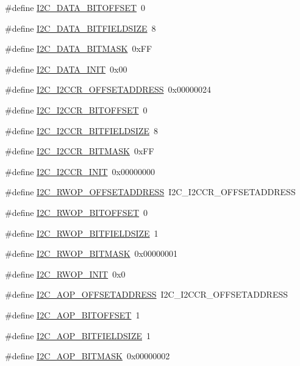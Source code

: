 \begin{DoxyCompactItemize}
\item 
\#define \hyperlink{a00558_ae541003460940c1afc89be6675f78185}{I2C\_\-DATA\_\-BITOFFSET}~0
\item 
\#define \hyperlink{a00558_ac2d18646ada8e52aa14a7a637e2a5b0a}{I2C\_\-DATA\_\-BITFIELDSIZE}~8
\item 
\#define \hyperlink{a00558_af2b064c86fc0a754a497a2eb7ef47b7c}{I2C\_\-DATA\_\-BITMASK}~0xFF
\item 
\#define \hyperlink{a00558_a28bf02f9cb53f0558cdaf6de566fca64}{I2C\_\-DATA\_\-INIT}~0x00
\item 
\#define \hyperlink{a00558_a6c2fd3bb081f7b3ff4ef584f1a1c085e}{I2C\_\-I2CCR\_\-OFFSETADDRESS}~0x00000024
\item 
\#define \hyperlink{a00558_a5c6ecafa02f586a1bd1fe8c34f74cc4b}{I2C\_\-I2CCR\_\-BITOFFSET}~0
\item 
\#define \hyperlink{a00558_ad4c3103d48702ae4c190be876772b27c}{I2C\_\-I2CCR\_\-BITFIELDSIZE}~8
\item 
\#define \hyperlink{a00558_abc30e516bb763d42f659631a6b7d9b9f}{I2C\_\-I2CCR\_\-BITMASK}~0xFF
\item 
\#define \hyperlink{a00558_a71e31a2372cedd463e3bb11ff4807403}{I2C\_\-I2CCR\_\-INIT}~0x00000000
\item 
\#define \hyperlink{a00558_afdbb6692c323d59cfc35da6aae8dbc47}{I2C\_\-RWOP\_\-OFFSETADDRESS}~I2C\_\-I2CCR\_\-OFFSETADDRESS
\item 
\#define \hyperlink{a00558_a1ca93b2ce3091343a23a8bf786c30e3f}{I2C\_\-RWOP\_\-BITOFFSET}~0
\item 
\#define \hyperlink{a00558_abe2e481dff55ba68056cc3bd68b83f52}{I2C\_\-RWOP\_\-BITFIELDSIZE}~1
\item 
\#define \hyperlink{a00558_a52e598b16c770284a6de2f90dd2ea820}{I2C\_\-RWOP\_\-BITMASK}~0x00000001
\item 
\#define \hyperlink{a00558_a9438958b1b121391484e9cec6dfa0a8b}{I2C\_\-RWOP\_\-INIT}~0x0
\item 
\#define \hyperlink{a00558_ad87d5d020a0afe3c5bbe526adea1c467}{I2C\_\-AOP\_\-OFFSETADDRESS}~I2C\_\-I2CCR\_\-OFFSETADDRESS
\item 
\#define \hyperlink{a00558_afc6f37f25e42af36c0cfcc0bad383a9e}{I2C\_\-AOP\_\-BITOFFSET}~1
\item 
\#define \hyperlink{a00558_abcd3ada0fb9e296e674e9387a32d9d8a}{I2C\_\-AOP\_\-BITFIELDSIZE}~1
\item 
\#define \hyperlink{a00558_a37fb7dbbd7b8620bb4fadd1933b4ae75}{I2C\_\-AOP\_\-BITMASK}~0x00000002
\item 

\end{DoxyCompactItemize}
